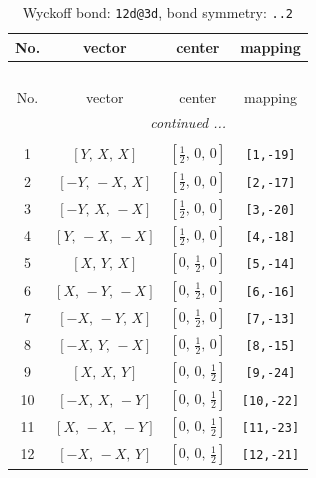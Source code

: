 \documentclass[fleqn,8pt]{jsarticle}
\begin{document}
\begin{longtable}{cccc}
\caption{Wyckoff bond: {\tt 12d@3d}, bond symmetry: {\tt ..2}}
 \\
 \hline \hline
No. & vector & center & mapping \\ \hline \endfirsthead

\multicolumn{3}{l}{\tablename\ \thetable{}} \\
 \hline \hline
No. & vector & center & mapping \\ \hline \endhead

 \hline \hline
\multicolumn{3}{r}{\footnotesize\it continued ...} \\ \endfoot

 \hline \hline
\multicolumn{3}{r}{} \\ \endlastfoot

1 & $\left[ Y,\, X,\, X \right]$ & $\left[ \frac{1}{2},\, 0,\, 0 \right]$ & {\tt [1,-19]} \\ \hline
2 & $\left[ - Y,\, - X,\, X \right]$ & $\left[ \frac{1}{2},\, 0,\, 0 \right]$ & {\tt [2,-17]} \\ \hline
3 & $\left[ - Y,\, X,\, - X \right]$ & $\left[ \frac{1}{2},\, 0,\, 0 \right]$ & {\tt [3,-20]} \\ \hline
4 & $\left[ Y,\, - X,\, - X \right]$ & $\left[ \frac{1}{2},\, 0,\, 0 \right]$ & {\tt [4,-18]} \\ \hline
5 & $\left[ X,\, Y,\, X \right]$ & $\left[ 0,\, \frac{1}{2},\, 0 \right]$ & {\tt [5,-14]} \\ \hline
6 & $\left[ X,\, - Y,\, - X \right]$ & $\left[ 0,\, \frac{1}{2},\, 0 \right]$ & {\tt [6,-16]} \\ \hline
7 & $\left[ - X,\, - Y,\, X \right]$ & $\left[ 0,\, \frac{1}{2},\, 0 \right]$ & {\tt [7,-13]} \\ \hline
8 & $\left[ - X,\, Y,\, - X \right]$ & $\left[ 0,\, \frac{1}{2},\, 0 \right]$ & {\tt [8,-15]} \\ \hline
9 & $\left[ X,\, X,\, Y \right]$ & $\left[ 0,\, 0,\, \frac{1}{2} \right]$ & {\tt [9,-24]} \\ \hline
10 & $\left[ - X,\, X,\, - Y \right]$ & $\left[ 0,\, 0,\, \frac{1}{2} \right]$ & {\tt [10,-22]} \\ \hline
11 & $\left[ X,\, - X,\, - Y \right]$ & $\left[ 0,\, 0,\, \frac{1}{2} \right]$ & {\tt [11,-23]} \\ \hline
12 & $\left[ - X,\, - X,\, Y \right]$ & $\left[ 0,\, 0,\, \frac{1}{2} \right]$ & {\tt [12,-21]} \\
\end{longtable}
\end{document}
